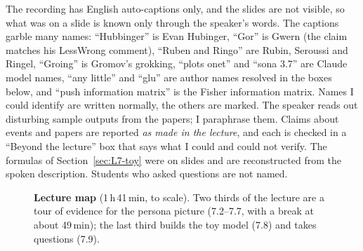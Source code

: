 \begin{caution}
The recording has English auto-captions only, and the slides are not visible, so what was on a slide is known only through the speaker's words. The captions garble many names: ``Hubbinger'' is Evan Hubinger, ``Gor'' is Gwern (the claim matches his LessWrong comment), ``Ruben and Ringo'' are Rubin, Seroussi and Ringel, ``Groing'' is Gromov's grokking, ``plots onet'' and ``sona 3.7'' are Claude model names, ``any little'' and ``glu'' are author names resolved in the boxes below, and ``push information matrix'' is the Fisher information matrix. Names I could identify are written normally, the others are marked\flag. The speaker reads out disturbing sample outputs from the papers; I paraphrase them. Claims about events and papers are reported \emph{as made in the lecture}, and each is checked in a ``Beyond the lecture'' box that says what I could and could not verify. The formulas of Section~\ref{sec:L7-toy} were on slides and are reconstructed from the spoken description. Students who asked questions are not named.
\end{caution}

\begin{figure}[tb]
\centering
{}
\caption{\textbf{Lecture map} (1\,h\,41\,min, to scale). Two thirds of the lecture are a tour of evidence for the persona picture (7.2--7.7, with a break at about 49\,min); the last third builds the toy model (7.8) and takes questions (7.9).}
\end{figure}

